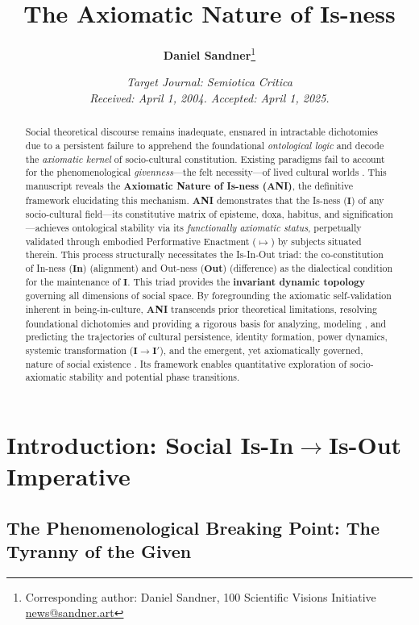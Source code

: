 \documentclass{article}
\title{\textbf{The Axiomatic Nature of Is-ness}}
\author{\textbf{Daniel Sandner}\thanks{Corresponding author: Daniel Sandner, 100 Scientific Visions Initiative \href{news@sandner.art}{news@sandner.art}}} %
\affil{\textit{Persona: Professor Kenji Ichi-Tanaka} \\ \textit{Professor of Socio-Cultural Dynamics, University of Southern Cascadia (Online Campus)}}
\date{\textit{Target Journal: Semiotica Critica} \\ \textit{Received: April 1, 2004. Accepted: April 1, 2025.}}
\newcommand{\ANI}{\textbf{ANI}}             %
\newcommand{\Isness}{\mathbf{I}}            %
\newcommand{\Inness}{\mathbf{In}}           %
\newcommand{\Outness}{\mathbf{Out}}         %
\newcommand{\enactment}{\ensuremath{\mapsto}} %
\begin{document}
\maketitle

\begin{abstract}
Social theoretical discourse remains inadequate, ensnared in intractable dichotomies due to a persistent failure to apprehend the foundational \textit{ontological logic} and decode the \textit{axiomatic kernel} \citep{Hofstadter1979} of socio-cultural constitution. Existing paradigms fail to account for the phenomenological \textit{givenness}—the felt necessity—of lived cultural worlds \citep{Schutz1967, Heidegger1962}. This manuscript reveals the \textbf{Axiomatic Nature of Is-ness (\ANI)}, the definitive framework elucidating this mechanism. \ANI{} demonstrates that the Is-ness ($\Isness$) of any socio-cultural field—its constitutive matrix of episteme, doxa, habitus, and signification—achieves ontological stability via its \textit{functionally axiomatic status}, perpetually validated through embodied Performative Enactment ($\enactment$) by subjects situated therein. This process structurally necessitates the Is-In-Out triad: the co-constitution of In-ness ($\Inness$) (alignment) and Out-ness ($\Outness$) (difference) as the dialectical condition for the maintenance of $\Isness$. This triad provides the \textbf{invariant dynamic topology} \citep{Bateson1972} governing all dimensions of social space. By foregrounding the axiomatic self-validation inherent in being-in-culture, \ANI{} transcends prior theoretical limitations, resolving foundational dichotomies \citep{Giddens1984} and providing a rigorous basis for analyzing, modeling \citep{Prigogine1984}, and predicting the trajectories of cultural persistence, identity formation, power dynamics, systemic transformation ($\Isness \rightarrow \Isness'$), and the emergent, yet axiomatically governed, nature of social existence \citep{Luhmann1995}. Its framework enables quantitative exploration of socio-axiomatic stability and potential phase transitions.
\end{abstract}

\section{Introduction: Social Is-In$\rightarrow$Is-Out Imperative}

\subsection{The Phenomenological Breaking Point: The Tyranny of the Given}
\end{document}
